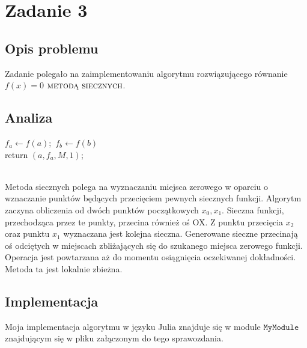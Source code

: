 \section{Zadanie 3}
\subsection{Opis problemu}
Zadanie polegało na zaimplementowaniu algorytmu rozwiązującego równanie $ f(x) = 0 $ $\textsc{metodą siecznych} $.
\subsection{Analiza}
\begin{algorithm}[H]
  $f_a \leftarrow f(a);$ $f_b \leftarrow f(b)$\\
  return $ (a, f_a, M, 1) $;  
\end{algorithm}

\ \\
Metoda siecznych polega na wyznaczaniu miejsca zerowego w oparciu o wznaczanie punktów będących przecięciem pewnych siecznych funkcji. Algorytm zaczyna obliczenia od dwóch punktów początkowych $ x_0, x_1 $. Sieczna funkcji, przechodząca przez te punkty, przecina również oś OX. Z punktu przecięcia $ x_2 $ oraz punktu $ x_1 $ wyznaczana jest kolejna sieczna. Generowane sieczne przecinają oś odciętych w miejscach zbliżających się do szukanego miejsca zerowego funkcji. Operacja jest powtarzana aż do momentu osiągnięcia oczekiwanej dokładności. Metoda ta jest lokalnie zbieżna.
\subsection{Implementacja}
Moja implementacja algorytmu w języku Julia znajduje się w module $ \texttt{MyModule} $ znajdującym się w pliku załączonym do tego sprawozdania.